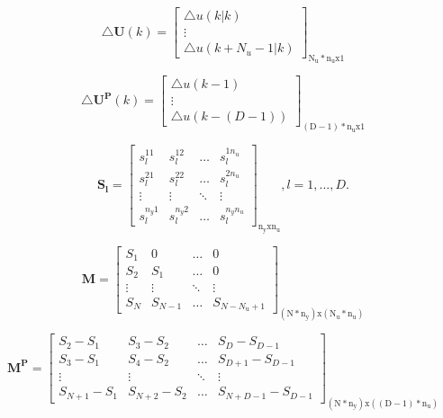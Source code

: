 \begin{equation}
\triangle\boldsymbol{U}(k)=\left[
\begin{array}{c}
\triangle u(k|k)\\
\vdots\\
\triangle u(k+N_u-1|k)
\end{array}
\right]_{\mathrm{N_u*n_ux1}}
\label{dUms}
\end{equation}

\begin{equation}
\triangle\boldsymbol{U^P}(k)=\left[
\begin{array}{c}
\triangle u(k-1)\\
\vdots\\
\triangle u(k-(D-1))
\end{array}
\right]_{\mathrm{(D-1)*n_ux1}}
\label{dUPm}
\end{equation}

\begin{equation}
\boldsymbol{S_l}=\left[
\begin{array}
{cccc}
s^{11}_l & s^{12}_l & \ldots & s^{1n_u}_l\\
s^{21}_l & s^{22}_l & \ldots & s^{2n_u}_l\\
\vdots & \vdots & \ddots & \vdots\\
s^{n_y1}_l& s^{n_y2}_l & \ldots &  s^{n_yn_u}_l
\end{array}
\right]_{\mathrm{n_yxn_u}}
\label{S}
, l=1,...,D.
\end{equation}

\begin{equation}
\boldsymbol{M}=\left[
\begin{array}
{cccc}
S_{1} & 0 & \ldots & 0\\
S_{2} & S_{1} & \ldots & 0\\
\vdots & \vdots & \ddots & \vdots\\
S_{N} & S_{N-1} & \ldots &  S_{N-N_{\mathrm{u}}+1}
\end{array}
\right]_{\mathrm{(N*n_y)x(N_u*n_u)}}
\label{Mm}
\end{equation}

\begin{equation}
\boldsymbol{M^P}=\left[
\begin{array}
{cccc}
S_{2}-S_{1} & S_{3}-S_{2} & \ldots & S_{D}-S_{D-1}\\
S_{3}-S_{1} & S_{4}-S_{2} & \ldots & S_{D+1}-S_{D-1}\\
\vdots & \vdots & \ddots & \vdots\\
S_{N+1}-S_{1} & S_{N+2}-S_{2} & \ldots &  S_{N+D-1}-S_{D-1}
\end{array}
\right]_{\mathrm{(N*n_y)x((D-1)*n_u)}}
\label{MPm}
\end{equation}


